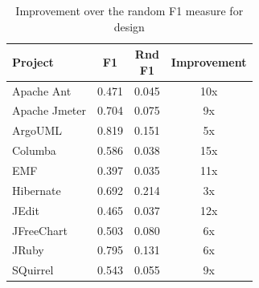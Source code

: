 \begin{table}[!hbt]
    \begin{center}
        \caption{Improvement over the random F1 measure for design}
        \label{tbl:improvement_f1measure_design}
        \begin{tabular}{l| c c c }
        \toprule
        \textbf{Project} & \textbf{F1} & \thead{Rnd\\F1} & \textbf{Improvement}\\
        \midrule
         Apache Ant      &  0.471      &  0.045          & 10x\\
         Apache Jmeter   &  0.704      &  0.075          & 9x\\
         ArgoUML         &  0.819      &  0.151          & 5x\\
         Columba         &  0.586      &  0.038          & 15x\\
         EMF             &  0.397      &  0.035          & 11x\\
         Hibernate       &  0.692      &  0.214          & 3x\\
         JEdit           &  0.465      &  0.037          & 12x\\
         JFreeChart      &  0.503      &  0.080          & 6x\\
         JRuby           &  0.795      &  0.131          & 6x\\
         SQuirrel        &  0.543      &  0.055          & 9x\\
        \bottomrule
        \end{tabular}
    \end{center}    
\end{table}

